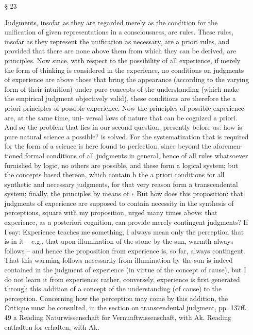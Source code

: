 § 23

Judgments, insofar as they are regarded merely as the condition for the
uniﬁcation of given representations in a consciousness, are rules. These
rules, insofar as they represent the uniﬁcation as necessary, are a priori
rules, and provided that there are none above them from which they can
be derived, are principles. Now since, with respect to the possibility of all
experience, if merely the form of thinking is considered in the experience,
no conditions on judgments of experience are above those that bring
the appearance (according to the varying form of their intuition) under
pure concepts of the understanding (which make the empirical judgment
objectively valid), these conditions are therefore the a priori principles
of possible experience.
Now the principles of possible experience are, at the same time, uni-
versal laws of nature that can be cognized a priori. And so the problem
that lies in our second question, presently before us: how is pure natural
science a possible? is solved. For the systematization that is required for the
form of a science is here found to perfection, since beyond the aforemen-
tioned formal conditions of all judgments in general, hence of all rules
whatsoever furnished by logic, no others are possible, and these form
a logical system; but the concepts based thereon, which contain b the a
priori conditions for all synthetic and necessary judgments, for that very
reason form a transcendental system; ﬁnally, the principles by means of
∗ But how does this proposition: that judgments of experience are supposed to
contain necessity in the synthesis of perceptions, square with my proposition,
urged many times above: that experience, as a posteriori cognition, can provide
merely contingent judgments? If I say: Experience teaches me something, I
always mean only the perception that is in it – e.g., that upon illumination of
the stone by the sun, warmth always follows – and hence the proposition from
experience is, so far, always contingent. That this warming follows necessarily
from illumination by the sun is indeed contained in the judgment of experience
(in virtue of the concept of cause), but I do not learn it from experience; rather,
conversely, experience is ﬁrst generated through this addition of a concept of
the understanding (of cause) to the perception. Concerning how the perception
may come by this addition, the Critique must be consulted, in the section on
transcendental judgment, pp. 137ff. 49
a Reading Naturwissenschaft for Vernunftwissenschaft, with Ak.
Reading enthalten for erhalten, with Ak.
